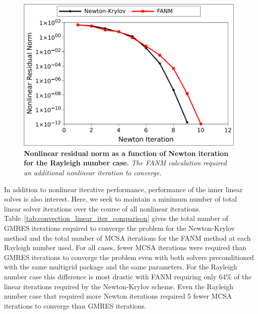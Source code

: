 \begin{figure}[htpb!]
  \begin{center}
    \includegraphics[width=6in]{chapters/nonlinear_problem/ra_1e5_convergence.pdf}
  \end{center}
  \caption{\textbf{Nonlinear residual norm as a function of Newton
      iteration for the  Rayleigh number case.} \textit{The
      FANM calculation required an additional nonlinear iteration to
      converge.}}
  \label{fig:ra1e5_convergence}
\end{figure}

In addition to nonlinear iterative performance, performance of the
inner linear solves is also interest. Here, we seek to maintain a
minimum number of total linear solver iterations over the course of
all nonlinear
iterations. Table~\ref{tab:convection_linear_iter_comparison} gives
the total number of GMRES iterations required to converge the problem
for the Newton-Krylov method and the total number of MCSA iterations
for the FANM method at each Rayleigh number used. For all cases, fewer
MCSA iterations were required than GMRES iterations to converge the
problem even with both solvers preconditioned with the same multigrid
package and the same parameters. For the  Rayleigh number
case this difference is most drastic with FANM requiring only 64\% of
the linear iterations required by the Newton-Krylov scheme. Even the
 Rayleigh number case that required more Newton iterations
required 5 fewer MCSA iterations to converge than GMRES iterations.

